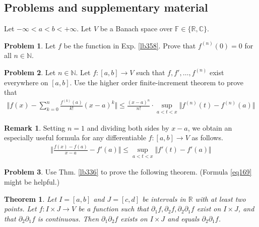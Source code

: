 \documentclass[12pt,b5paper,notitlepage]{article}
\theoremstyle{definition}
\newtheorem{rem}[df]{Remark}
\newtheorem{prob}{\color{red}Problem}[section]
\theoremstyle{plain}
\newtheorem{thm}[df]{Theorem}
\newcommand{\Cbb}{\mathbb C}
\newcommand{\Nbb}{\mathbb N}
\newcommand{\Rbb}{\mathbb R}
\newcommand{\Fbb}{\mathbb F}
\numberwithin{equation}{section}
\begin{document}
\subsection{Problems and supplementary material}


Let $-\infty<a<b<+\infty$. Let $V$ be a Banach space over $\Fbb\in\{\Rbb,\Cbb\}$.


\begin{prob}
Let $f$ be the function in Exp. \ref{lb358}. Prove that $f^{(n)}(0)=0$ for all $n\in\Nbb$.
\end{prob}




\begin{prob}\label{lb361}
Let $n\in\Nbb$. Let $f:[a,b]\rightarrow V$ such that $f,f',\dots,f^{(n)}$ exist everywhere on $[a,b]$. Use the higher order finite-increment theorem to prove that
\begin{align*}
\Big\Vert f(x)-\sum_{k=0}^n\frac{f^{(k)}(a)}{k!}(x-a)^k\Big\Vert\leq \frac{(x-a)^{n}}{n!}\cdot \sup_{a<t<x}\Vert f^{(n)}(t)-f^{(n)}(a)\Vert 
\end{align*}
\end{prob}

\begin{rem}\label{lb404}
Setting $n=1$ and dividing both sides by $x-a$, we obtain an especially useful formula for any differentiable $f:[a,b]\rightarrow V$ as follows.
\begin{align}
\Big\Vert \frac{f(x)-f(a)}{x-a}-f'(a)\Big\Vert\leq \sup_{a<t<x}
\big\Vert f'(t)-f'(a)\big\Vert  \label{eq169}
\end{align}
\end{rem}


\begin{prob}
Use Thm. \ref{lb336} to prove the following theorem. (Formula \eqref{eq169} might be helpful.)
\end{prob}



\begin{thm}\label{lb406}
Let $I=[a,b]$ and $J=[c,d]$ be intervals in $\Rbb$ with at least two points. Let $f:I\times J\rightarrow V$ be a function such that $\partial_1f,\partial_2f,\partial_2\partial_1f$ exist on $I\times J$, and that $\partial_2\partial_1f$ is continuous. Then $\partial_1\partial_2f$ exists on $I\times J$ and equals $\partial_2\partial_1f$.
\end{thm}
\end{document}
